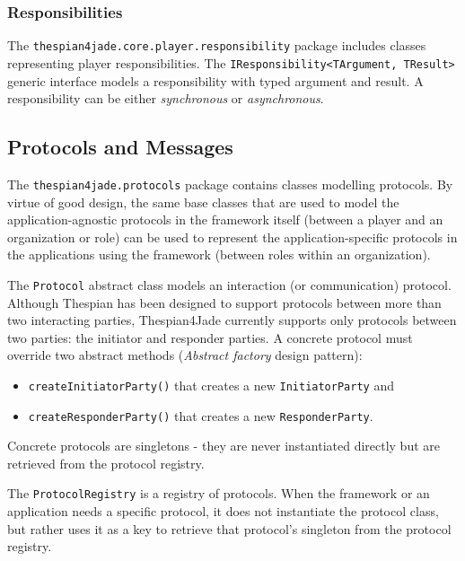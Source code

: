 \subsubsection{Responsibilities}

The \texttt{thespian4jade.core.player.responsibility} package includes classes representing player responsibilities.
The \texttt{IResponsibility<TArgument, TResult>} generic interface models a responsibility with typed argument and result.
A responsibility can be either \textit{synchronous} or \textit{asynchronous}.


\subsection{Protocols and Messages}

The \texttt{thespian4jade.protocols} package contains classes modelling protocols.
By virtue of good design, the same base classes that are used to model the application-agnostic protocols in the framework itself (between a player and an organization or role) can be used to represent the application-specific protocols in the applications using the framework (between roles within an organization). 

The \texttt{Protocol} abstract class models an interaction (or communication) protocol.
Although Thespian has been designed to support protocols between more than two interacting parties, Thespian4Jade currently supports only protocols between two parties: the initiator and responder parties.
A concrete protocol must override two abstract methods (\textit{Abstract factory} design pattern):
\begin{itemize}
	\item \texttt{createInitiatorParty()} that creates a new \texttt{InitiatorParty} and
	\item \texttt{createResponderParty()} that creates a new \texttt{ResponderParty}.
\end{itemize}
Concrete protocols are singletons - they are never instantiated directly but are retrieved from the protocol registry.

The \texttt{ProtocolRegistry} is a registry of protocols.
When the framework or an application needs a specific protocol, it does not instantiate the protocol class, but rather uses it as a key to retrieve that protocol's singleton from the protocol registry. 

